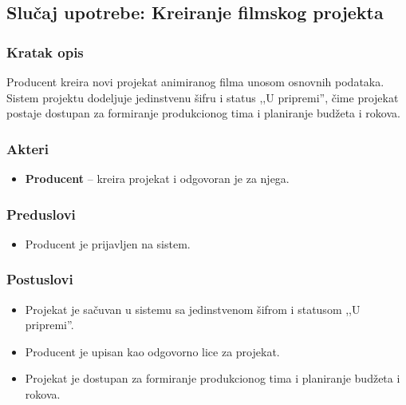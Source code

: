 \subsection{Slučaj upotrebe: Kreiranje filmskog projekta}

\subsubsection*{Kratak opis}

Producent kreira novi projekat animiranog filma unosom osnovnih podataka.
Sistem projektu dodeljuje jedinstvenu šifru i status ,,U pripremi'', čime
projekat postaje dostupan za formiranje produkcionog tima i planiranje budžeta
i rokova.

\subsubsection*{Akteri}
\begin{itemize}
    \item \textbf{Producent} -- kreira projekat i odgovoran je za njega.
\end{itemize}

\subsubsection*{Preduslovi}
\begin{itemize}
    \item Producent je prijavljen na sistem.
\end{itemize}

\subsubsection*{Postuslovi}
\begin{itemize}
    \item Projekat je sačuvan u sistemu sa jedinstvenom šifrom i statusom ,,U pripremi''.
    \item Producent je upisan kao odgovorno lice za projekat.
    \item Projekat je dostupan za formiranje produkcionog tima i planiranje budžeta i rokova.
\end{itemize}

